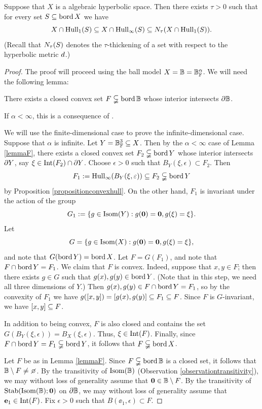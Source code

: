 \begin{proposition}
\label{propositionhull}
Suppose that $X$ is a algebraic hyperbolic space. Then there exists $\tau > 0$ such that for every set $S\subseteq\operatorname{bord} X$ we have
\[
X\cap \operatorname{Hull}_1(S) \subseteq X\cap \operatorname{Hull}_\infty(S) \subseteq N_\tau(X\cap\operatorname{Hull}_1(S)).
\]
(Recall that $N_\tau(S)$ denotes the $\tau$-thickening of a set with respect to the hyperbolic metric $d$.)
\end{proposition}
\begin{proof}
The proof will proceed using the ball model $X = \B = \B_\F^\alpha$. We will need the following lemma:
\begin{lemma}
\label{lemmaF}
There exists a closed convex set $F\propersubset\bord\B$ whose interior intersects $\del\B$.
\end{lemma}
\begin{subproof}
If $\alpha < \infty$, this is a consequence of \cite[Theorem 3.3]{Anderson}.

We will use the finite-dimensional case to prove the infinite-dimensional case. Suppose that $\alpha$ is infinite. Let $Y = \B_\F^3 \subset X$. Then by the $\alpha < \infty$ case of Lemma \ref{lemmaF}, there exists a closed convex set $F_2 \subsetneqq\operatorname{bord} Y$ whose interior intersects $\partial Y$, say $\xi\in \operatorname{Int}(F_2)\cap\partial Y$. Choose $\epsilon > 0$ such that $B_Y(\xi,\epsilon) \subset F_2$. Then
\[
F_1 := \operatorname{Hull}_\infty(B_Y(\xi,\varepsilon)) \subseteq F_2 \subsetneqq \operatorname{bord} Y
\]
by Proposition \ref{propositionconvexhull}. On the other hand, $F_1$ is invariant under the action of the group
\[
G_1 := \{g\in\operatorname{Isom}(Y) : g(\mathbf 0) = \mathbf 0, g(\xi) = \xi\}.
\]
Let
\[
G = \{g\in\operatorname{Isom}(X) : g(\mathbf 0) = \mathbf 0, g(\xi) = \xi\},
\]
and note that $G(\operatorname{bord} Y) = \operatorname{bord} X$. Let $F = G(F_1)$, and note that $F\cap \operatorname{bord} Y = F_1$. We claim that $F$ is convex. Indeed, suppose that $x,y\in F$; then there exists $g\in G$ such that $g(x),g(y)\in\operatorname{bord} Y$. (Note that in this step, we need all three dimensions of $Y$.) Then $g(x),g(y)\in F\cap \operatorname{bord} Y = F_1$, so by the convexity of $F_1$ we have $g([x,y]) = [g(x),g(y)] \subseteq F_1 \subseteq F$. Since $F$ is $G$-invariant, we have $[x,y]\subseteq F$.

In addition to being convex, $F$ is also closed and contains the set $G(B_Y(\xi,\epsilon)) = B_X(\xi,\epsilon)$. Thus, $\xi\in\operatorname{Int}(F)$. Finally, since $F\cap \operatorname{bord} Y = F_1 \subsetneqq \operatorname{bord} Y$, it follows that $F\subsetneqq\operatorname{bord} X$.
\end{subproof}
Let $F$ be as in Lemma \ref{lemmaF}. Since $F\propersubset\bord\B$ is a closed set, it follows that $\B\butnot F\neq\emptyset$. By the transitivity of $\Isom(\B)$ (Observation \ref{observationtransitivity}), we may without loss of generality assume that $\0\in\B\butnot F$. By the transitivity of $\Stab(\Isom(\B);\0)$ on $\del\B$, we may without loss of generality assume that $\mathbf e_1\in\operatorname{Int}(F)$. Fix $\epsilon > 0$ such that $B(\ee_1,\epsilon) \subset F$.


\end{proof}
